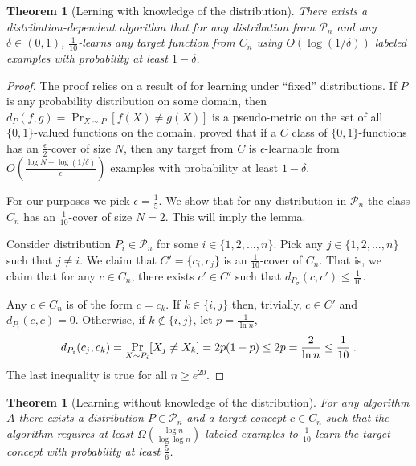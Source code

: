 \documentclass[10pt]{article}
\newtheorem{theorem}[proposition]{Theorem}
\renewcommand{\P}{\mathcal{P}}
\begin{document}
\begin{theorem}[Lerning with knowledge of the distribution]
There exists a distribution-dependent algorithm that for any distribution from
$\P_n$ and any $\delta \in (0,1)$, $\frac{1}{10}$-learns any target function from $C_n$ using
$O \left( \log(1/\delta) \right)$ labeled examples with probability at least $1 -
\delta$.
\end{theorem}

\begin{proof}
The proof relies on a result of \cite{Benedek-Itai-1991} for learning under
``fixed'' distributions. If $P$ is any probability distribution on some domain,
then $d_P(f,g) = \Pr_{X \sim P}[f(X) \neq g(X)]$ is a pseudo-metric on the set of all
$\{0,1\}$-valued functions on the domain. \cite{Benedek-Itai-1991} proved that
if a $C$ class of $\{0,1\}$-functions has an $\frac{\epsilon}{2}$-cover of size
$N$, then any target from $C$ is $\epsilon$-learnable from $O
\left( \frac{\log N + \log (1/\delta)}{\epsilon}\right)$ examples
with probability at least $1-\delta$.

For our purposes we pick $\epsilon = \frac{1}{5}$. We show that for any
distribution in $\P_n$ the class $C_n$ has an $\frac{1}{10}$-cover of size $N =
2$. This will imply the lemma.

Consider distribution $P_i \in \P_n$ for some $i \in \{1,2,\dots,n\}$.
Pick any $j \in \{1,2,\dots,n\}$ such that $j \neq i$.
We claim that $C' = \{ c_i, c_j \}$ is an $\frac{1}{10}$-cover of
$C_n$. That is, we claim that for any $c \in C_n$, there exists $c' \in
C'$ such that $d_{P_{\sigma}}(c,c') \le \frac{1}{10}$.

Any $c \in C_n$ is of the form $c = c_k$. If $k \in \{i,j\}$ then, trivially, $c \in C'$ and $d_{P_i}(c,c) = 0$.
Otherwise, if  $k \not \in \{i,j\}$, let $p = \frac{1}{\ln n}$,
$$
d_{P_i}(c_j, c_k)
= \Pr_{X \sim P_i}[X_j \neq X_k] \\
= 2 p (1 - p) \\
\le 2p \\
= \frac{2}{\ln n} \\
\le \frac{1}{10} \; .
$$
The last inequality is true for all $n \ge e^{20}$.
\end{proof}



\begin{theorem}[Learning without knowledge of the distribution]
For any algorithm $A$ there exists a distribution $P \in \P_n$ and a target
concept $c \in C_n$ such that the algorithm requires at least  $\Omega \left(
\frac{\log n}{\log \log n} \right)$ labeled examples to $\frac{1}{10}$-learn the
target concept with probability at least $\frac{5}{6}$.
\end{theorem}
\end{document}
